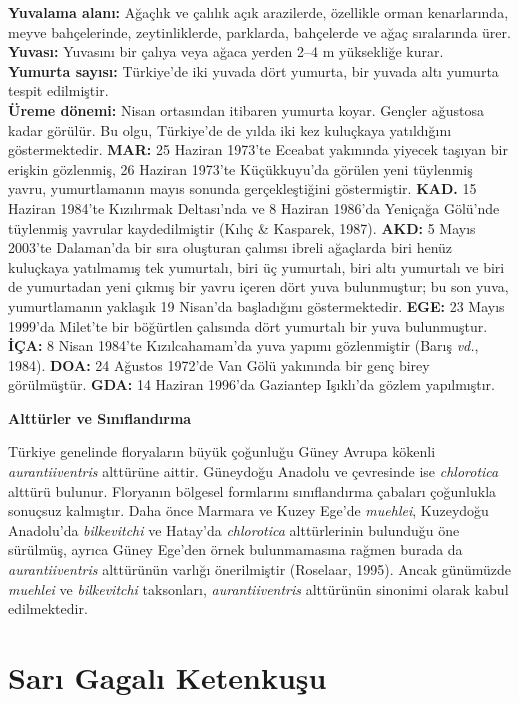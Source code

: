 \documentclass[
  10.5pt,
  a4paper,
  DIV=11,
  numbers=noendperiod,
  twocolumn]{scrreprt}
\begin{document}
\textbf{Yuvalama alanı:} Ağaçlık ve çalılık açık arazilerde, özellikle
orman kenarlarında, meyve bahçelerinde, zeytinliklerde, parklarda,
bahçelerde ve ağaç sıralarında ürer.\\
\textbf{Yuvası:} Yuvasını bir çalıya veya ağaca yerden 2--4 m yüksekliğe
kurar.\\
\textbf{Yumurta sayısı:} Türkiye'de iki yuvada dört yumurta, bir yuvada
altı yumurta tespit edilmiştir.\\
\textbf{Üreme dönemi:} Nisan ortasından itibaren yumurta koyar. Gençler
ağustosa kadar görülür. Bu olgu, Türkiye'de de yılda iki kez kuluçkaya
yatıldığını göstermektedir. \textbf{MAR:} 25 Haziran 1973'te Eceabat
yakınında yiyecek taşıyan bir erişkin gözlenmiş, 26 Haziran 1973'te
Küçükkuyu'da görülen yeni tüylenmiş yavru, yumurtlamanın mayıs sonunda
gerçekleştiğini göstermiştir. \textbf{KAD.} 15 Haziran 1984'te
Kızılırmak Deltası'nda ve 8 Haziran 1986'da Yeniçağa Gölü'nde tüylenmiş
yavrular kaydedilmiştir (Kılıç \& Kasparek, 1987). \textbf{AKD:} 5 Mayıs
2003'te Dalaman'da bir sıra oluşturan çalımsı ibreli ağaçlarda biri
henüz kuluçkaya yatılmamış tek yumurtalı, biri üç yumurtalı, biri altı
yumurtalı ve biri de yumurtadan yeni çıkmış bir yavru içeren dört yuva
bulunmuştur; bu son yuva, yumurtlamanın yaklaşık 19 Nisan'da başladığını
göstermektedir. \textbf{EGE:} 23 Mayıs 1999'da Milet'te bir böğürtlen
çalısında dört yumurtalı bir yuva bulunmuştur. \textbf{İÇA:} 8 Nisan
1984'te Kızılcahamam'da yuva yapımı gözlenmiştir (Barış \emph{vd.},
1984). \textbf{DOA:} 24 Ağustos 1972'de Van Gölü yakınında bir genç
birey görülmüştür. \textbf{GDA:} 14 Haziran 1996'da Gaziantep Işıklı'da
gözlem yapılmıştır.

\textbf{Alttürler ve Sınıflandırma}

Türkiye genelinde floryaların büyük çoğunluğu Güney Avrupa kökenli
\emph{aurantiiventris} alttürüne aittir. Güneydoğu Anadolu ve çevresinde
ise \emph{chlorotica} alttürü bulunur. Floryanın bölgesel formlarını
sınıflandırma çabaları çoğunlukla sonuçsuz kalmıştır. Daha önce Marmara
ve Kuzey Ege'de \emph{muehlei}, Kuzeydoğu Anadolu'da \emph{bilkevitchi}
ve Hatay'da \emph{chlorotica} alttürlerinin bulunduğu öne sürülmüş,
ayrıca Güney Ege'den örnek bulunmamasına rağmen burada da
\emph{aurantiiventris} alttürünün varlığı önerilmiştir (Roselaar, 1995).
Ancak günümüzde \emph{muehlei} ve \emph{bilkevitchi} taksonları,
\emph{aurantiiventris} alttürünün sinonimi olarak kabul edilmektedir.

\section{Sarı Gagalı Ketenkuşu}\label{sarux131-gagalux131-ketenkuux15fu}
\end{document}
